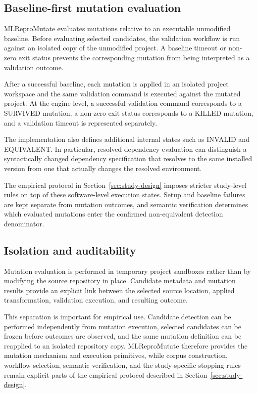 \subsection{Baseline-first mutation evaluation}
\label{sec:mlrepromutate-evaluation}

MLReproMutate evaluates mutations relative to an executable unmodified
baseline. Before evaluating selected candidates, the validation workflow is run
against an isolated copy of the unmodified project. A baseline timeout or
non-zero exit status prevents the corresponding mutation from being interpreted
as a validation outcome.

After a successful baseline, each mutation is applied in an isolated project
workspace and the same validation command is executed against the mutated
project. At the engine level, a successful validation command corresponds to a
SURVIVED mutation, a non-zero exit status corresponds to a KILLED mutation, and
a validation timeout is represented separately.

The implementation also defines additional internal states such as INVALID and
EQUIVALENT. In particular, resolved dependency evaluation can distinguish a
syntactically changed dependency specification that resolves to the same
installed version from one that actually changes the resolved environment.

The empirical protocol in Section~\ref{sec:study-design} imposes stricter
study-level rules on top of these software-level execution states. Setup and
baseline failures are kept separate from mutation outcomes, and semantic
verification determines which evaluated mutations enter the confirmed
non-equivalent detection denominator.


\subsection{Isolation and auditability}
\label{sec:mlrepromutate-auditability}

Mutation evaluation is performed in temporary project sandboxes rather than by
modifying the source repository in place. Candidate metadata and mutation
results provide an explicit link between the selected source location, applied
transformation, validation execution, and resulting outcome.

This separation is important for empirical use. Candidate detection can be
performed independently from mutation execution, selected candidates can be
frozen before outcomes are observed, and the same mutation definition can be
reapplied to an isolated repository copy. MLReproMutate therefore provides the
mutation mechanism and execution primitives, while corpus construction,
workflow selection, semantic verification, and the study-specific stopping
rules remain explicit parts of the empirical protocol described in
Section~\ref{sec:study-design}.
